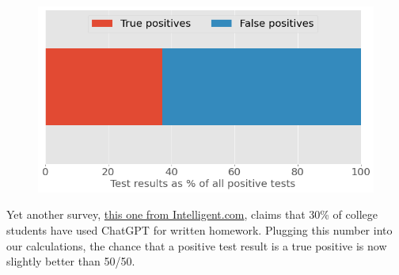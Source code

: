 \documentclass[
  letterpaper,
  DIV=11,
  numbers=noendperiod,
  oneside]{scrartcl}
\begin{document}

\begin{figure}

{\centering \includegraphics{fig2b.png}

}

\end{figure}


Yet another survey,
\href{https://www.prweb.com/releases/intelligent_com_survey_finds_30_percent_of_college_students_use_artificial_intelligence_chatbot_chatgpt_for_written_homework/prweb19141759.htm}{this
one from Intelligent.com}, claims that 30\% of college students have
used ChatGPT for written homework. Plugging this number into our
calculations, the chance that a positive test result is a true positive
is now slightly better than 50/50.
\end{document}
